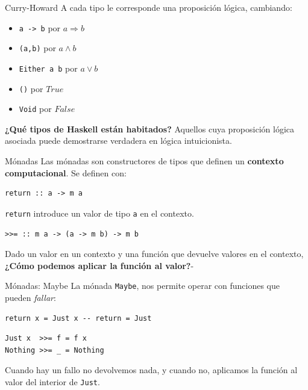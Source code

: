 \begin{frame}[fragile]{Curry-Howard}
 A cada tipo le corresponde una proposición lógica, cambiando:
 \begin{itemize}
  \item \texttt{a -> b} por $a \Rightarrow b$
  \item \texttt{(a,b)} por $a \wedge b$
  \item \texttt{Either a b} por $a \vee b$
  \item \texttt{()} por $True$
  \item \texttt{Void} por $False$
 \end{itemize}

 \espacio
 \textbf{¿Qué tipos de Haskell están habitados?} Aquellos cuya
 proposición lógica asociada puede demostrarse verdadera en lógica
 intuicionista.
 
\end{frame}

\begin{frame}[fragile]{Mónadas}
Las mónadas son constructores de tipos que definen un \textbf{contexto computacional}.
Se definen con:

\espacio

\begin{lstlisting}
return :: a -> m a
\end{lstlisting}
\texttt{return} introduce un valor de tipo \texttt{a} en el contexto.

\espacio

\begin{lstlisting}
>>= :: m a -> (a -> m b) -> m b
\end{lstlisting}
Dado un valor en un contexto y una función que devuelve valores en el contexto,
\textbf{¿Cómo podemos aplicar la función al valor?}-
\end{frame}

\begin{frame}[fragile]{Mónadas: Maybe}
La mónada \texttt{Maybe}, nos permite operar con funciones que pueden \textit{fallar}:

\begin{lstlisting}
return x = Just x -- return = Just
\end{lstlisting}

\espacio

\begin{lstlisting}
Just x  >>= f = f x
Nothing >>= _ = Nothing
\end{lstlisting}
Cuando hay un fallo no devolvemos nada, y cuando no, aplicamos la función al valor
del interior de \texttt{Just}.
\end{frame}

